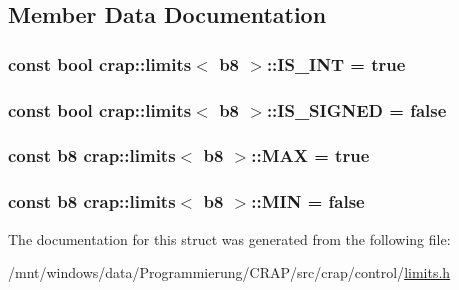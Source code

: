 \subsection{Member Data Documentation}
\hypertarget{structcrap_1_1limits_3_01b8_01_4_ade07f706657b5325f1d424710e1451c3}{
\subsubsection[{I\-S\-\_\-\-I\-N\-T}]{\setlength{\rightskip}{0pt plus 5cm}const bool {\bf crap\-::limits}$<$ {\bf b8} $>$\-::I\-S\-\_\-\-I\-N\-T = true\hspace{0.3cm}{\ttfamily [static]}}}\label{structcrap_1_1limits_3_01b8_01_4_ade07f706657b5325f1d424710e1451c3}
\hypertarget{structcrap_1_1limits_3_01b8_01_4_a08b3d51e6a03bb60785009fd3d68077b}{
\subsubsection[{I\-S\-\_\-\-S\-I\-G\-N\-E\-D}]{\setlength{\rightskip}{0pt plus 5cm}const bool {\bf crap\-::limits}$<$ {\bf b8} $>$\-::I\-S\-\_\-\-S\-I\-G\-N\-E\-D = false\hspace{0.3cm}{\ttfamily [static]}}}\label{structcrap_1_1limits_3_01b8_01_4_a08b3d51e6a03bb60785009fd3d68077b}
\hypertarget{structcrap_1_1limits_3_01b8_01_4_abb6122e7510a3d43e1e95a2543af6c0d}{
\subsubsection[{M\-A\-X}]{\setlength{\rightskip}{0pt plus 5cm}const {\bf b8} {\bf crap\-::limits}$<$ {\bf b8} $>$\-::M\-A\-X = true\hspace{0.3cm}{\ttfamily [static]}}}\label{structcrap_1_1limits_3_01b8_01_4_abb6122e7510a3d43e1e95a2543af6c0d}
\hypertarget{structcrap_1_1limits_3_01b8_01_4_ad7cee023c6e3c4ee5f1827e5becc110d}{
\subsubsection[{M\-I\-N}]{\setlength{\rightskip}{0pt plus 5cm}const {\bf b8} {\bf crap\-::limits}$<$ {\bf b8} $>$\-::M\-I\-N = false\hspace{0.3cm}{\ttfamily [static]}}}\label{structcrap_1_1limits_3_01b8_01_4_ad7cee023c6e3c4ee5f1827e5becc110d}


The documentation for this struct was generated from the following file\-:\begin{DoxyCompactItemize}
\item 
/mnt/windows/data/\-Programmierung/\-C\-R\-A\-P/src/crap/control/\hyperlink{limits_8h}{limits.\-h}\end{DoxyCompactItemize}
